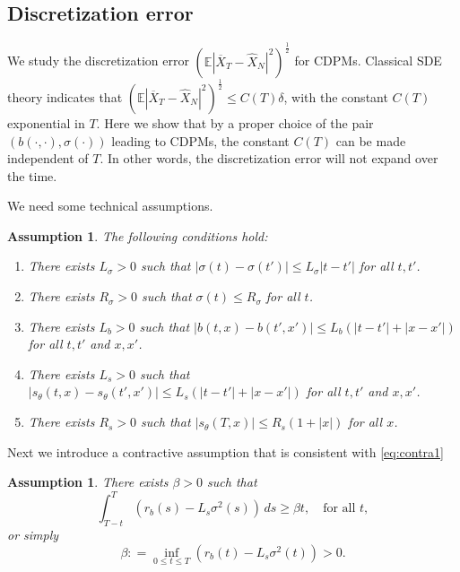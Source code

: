 \documentclass[letterpaper,11pt,reqno]{amsart}
\newtheorem{assump}[theorem]{Assumption}
\numberwithin{equation}{section}
\begin{document}
\subsection{Discretization error}
\label{sc32}

We study the discretization error $\left(\mathbb{E}|\overline{X}_T - \widehat{X}_N|^2\right)^{\frac{1}{2}}$
for CDPMs.
Classical SDE theory \cite{KP92} indicates that $\left(\mathbb{E}|\overline{X}_T - \widehat{X}_N|^2\right)^{\frac{1}{2}} \le C(T) \delta$,
with the constant $C(T)$ exponential in $T$.
Here we show that by a proper choice of the pair $(b(\cdot, \cdot), \sigma(\cdot))$ leading to CDPMs, 
the constant $C(T)$ can be made independent of $T$.
In other words, the discretization error will not expand over the time.

\quad We need some technical assumptions. 
\begin{assump}
\label{assump:2dis}
The following conditions hold:
\begin{enumerate}[itemsep = 3 pt]
\item 
There exists $L_\sigma > 0$ such that $|\sigma(t) - \sigma(t')| \le L_\sigma |t-t'|$ for all $t, t'$.
\item 
There exists $R_\sigma > 0$ such that $\sigma(t) \le R_\sigma$ for all $t$. 
\item 
There exists $L_b > 0$ such that $|b(t,x) - b(t',x')| \le L_b  (|t-t'| + |x - x'|)$ for all $t,t'$ and $x, x'$.
\item 
There exists $L_s > 0$ such that $|s_\theta(t,x) - s_\theta(t',x')| \le L_s (|t -t'| + |x- x'|)$ for all $t,t'$ and $x,x'$.
\item 
There exists $R_s > 0$ such that $|s_\theta(T,x)| \le R_s (1 + |x|)$ for all $x$.
\end{enumerate}
\end{assump}

\quad Next we introduce a contractive assumption that is consistent with \eqref{eq:contra1}

\begin{assump}
\label{assump:contraction}
There exists $\beta > 0$ such that
\begin{equation}
\label{eq:condcontraction}
\int_{T-t}^T (r_b(s) - L_s \sigma^2(s))\, ds \ge \beta t, \quad \mbox{for all }t,
\end{equation}
or simply 
\begin{equation}
\label{eq:contral2}
\beta: = \inf_{0 \le t \le T} \left(r_b(t) - L_s \sigma^2(t)\right) > 0.
\end{equation}
\end{assump}
\end{document}
